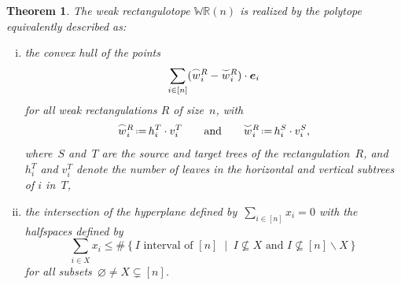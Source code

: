 \documentclass{amsart}
\newtheorem{theorem}{Theorem}%
\theoremstyle{definition}
\newcommand{\R}{\mathbb{R}} %
\renewcommand{\b}[1]{{\boldsymbol{#1}}} %
\newcommand{\set}[2]{\left\{ #1 \;\middle|\; #2 \right\}} %
\newcommand{\ssm}{\smallsetminus} %
\newcommand{\eqdef}{\mbox{\,\raisebox{0.2ex}{\scriptsize\ensuremath{\mathrm:}}\ensuremath{=}\,}} %
\newcommand{\polytope}[1]{\mathds{#1}} %
\newcommand{\WRP}{\polytope{WR}} %
\newcommand{\loday}[1]{\smash{\overset{\frown}{#1}}}
\newcommand{\antiloday}[1]{\smash{\overset{\smile}{#1}}}
\begin{document}
\begin{theorem}
  \label{thm:weakRectangulotope}
The weak rectangulotope $\WRP (n)$ is realized by the polytope equivalently described as:
  \begin{enumerate}[(i)]
  \item the convex hull of the points
    \[
    \sum_{i\in [n]} (\loday{w}^R_i - \antiloday{w}^R_i)\cdot \b{e}_i
    \]
    for all weak rectangulations $R$ of size~$n$, with
  \[
    \loday{w}^R_i \eqdef h^T_i\cdot v^T_i
    \qquad\text{and}\qquad
    \antiloday{w}^R_i \eqdef h^S_i\cdot v^S_i,
  \]
  where~$S$ and~$T$ are the source and target trees of the rectangulation~$R$, and $h^T_i$ and $v^T_i$ denote the number of leaves in the horizontal and vertical subtrees of $i$ in~$T$,
\item the intersection of the hyperplane defined by~$\sum_{i \in [n]} x_i = 0$ with the halfspaces defined by
  \[
  \sum_{i \in X} x_i \le \#\set{I \text{ interval of } [n]}{I \not\subseteq X \text{ and } I \not\subseteq [n] \ssm X}
  \]
  for all subsets~$\varnothing \ne X \subsetneq [n]$.
  \end{enumerate}
\end{theorem}
\end{document}
